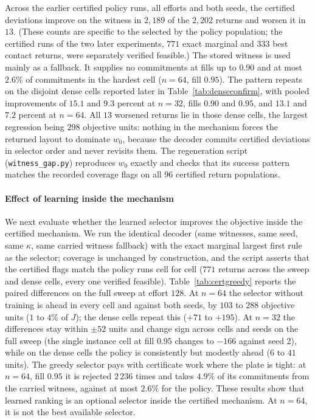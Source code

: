 \documentclass[preprint,12pt,authoryear]{elsarticle}
\newcommand{\code}[1]{\texttt{#1}}
\begin{document}
Across the earlier certified policy runs, all efforts and both seeds, the
certified deviations improve on the witness in $2{,}189$ of the $2{,}202$
returns and worsen it in $13$. (These counts are specific to the
selected by the policy population; the certified runs of the two later experiments,
$771$ exact marginal and $333$ best contact returns, were separately verified
feasible.) The stored witness is used mainly as a fallback. It supplies no
commitments at fills up to $0.90$ and at most
$2.6\%$ of commitments in the hardest cell ($n=64$, fill $0.95$). The pattern
repeats on the disjoint dense cells reported later in
Table~\ref{tab:denseconfirm}, with pooled improvements of $15.1$ and $9.3$
percent at $n=32$, fills $0.90$ and $0.95$, and $13.1$ and $7.2$ percent at
$n=64$. All $13$ worsened returns lie in those dense cells, the largest
regression being $298$ objective units: nothing in the mechanism forces the
returned layout to dominate $w_0$, because the decoder commits certified
deviations in selector order and never revisits them. The regeneration script
(\code{witness\_gap.py}) reproduces $w_0$ exactly and checks that its success
pattern matches the recorded coverage flags on all $96$ certified return
populations.

\paragraph{Effect of learning inside the mechanism}
We next evaluate whether the learned selector improves the objective inside the
certified mechanism. We run the identical decoder (same witnesses, same
seed, same $\kappa$, same carried witness fallback) with the exact marginal
largest first rule as the selector; coverage is unchanged by construction, and
the script asserts that the certified flags match the policy runs cell for
cell ($771$ returns across the sweep and dense cells, every one verified
feasible). Table~\ref{tab:certgreedy} reports the paired differences on the full
sweep at effort $128$. At $n=64$ the selector without training is ahead in every
cell and against both seeds, by $103$ to $288$ objective units ($1$ to $4\%$
of $J$); the dense cells repeat this ($+71$ to $+195$). At $n=32$ the
differences stay within $\pm52$ units and change sign across cells and seeds
on the full sweep (the single instance cell at fill $0.95$ changes to $-166$
against seed 2), while on the dense cells the policy is consistently but
modestly ahead ($6$ to $41$ units). The greedy selector pays with certificate
work where the plate is tight: at $n=64$, fill $0.95$ it is rejected $2\,236$
times and takes $4.9\%$ of its commitments from the carried witness, against
at most $2.6\%$ for the policy. These results show that learned ranking is an
optional selector inside the certified mechanism. At $n=64$, it is not the best
available selector.
\end{document}
